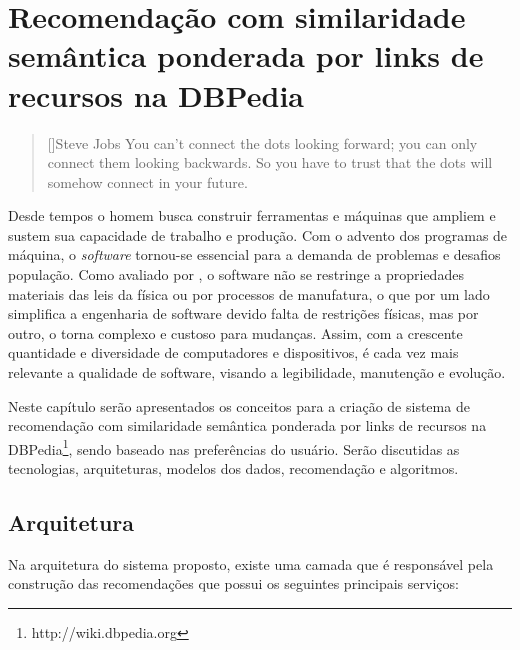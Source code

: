\chapter{Recomendação com similaridade semântica ponderada por links de recursos na DBPedia}
\label{cap:proposal}

\begin{quotation}[]{Steve Jobs}
You can't connect the dots looking forward; you can only connect them looking backwards. So you have to trust that the dots will somehow connect in your future.
\end{quotation}

Desde tempos o homem busca construir ferramentas e máquinas que ampliem e sustem sua capacidade de trabalho e produção. Com o advento dos programas de máquina, o \textit{software} tornou-se essencial para a demanda de problemas e desafios população. Como avaliado por \citep{Sommerville2010}, o software não se restringe a propriedades materiais das leis da física ou por processos de manufatura, o que por um lado simplifica a engenharia de software devido falta de restrições físicas, mas por outro, o torna complexo e custoso para mudanças. Assim, com a crescente quantidade e diversidade de computadores e dispositivos, é cada vez mais relevante a qualidade de software, visando a legibilidade, manutenção e evolução.

Neste capítulo serão apresentados os conceitos para a criação de sistema de recomendação com similaridade semântica ponderada por links de recursos na DBPedia\footnote{http://wiki.dbpedia.org}, sendo baseado nas preferências do usuário. Serão discutidas as tecnologias, arquiteturas, modelos dos dados, recomendação e algoritmos.

\section{Arquitetura}

Na arquitetura do sistema proposto, existe uma camada que é responsável pela construção das recomendações que possui os seguintes principais serviços:

